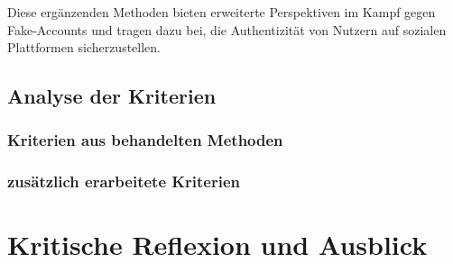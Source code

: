 \documentclass[12pt]{report}
\begin{document}
Diese ergänzenden Methoden bieten erweiterte Perspektiven im Kampf gegen Fake-Accounts und tragen dazu bei, die Authentizität von Nutzern auf sozialen Plattformen sicherzustellen.

\section{Analyse der Kriterien}
\subsection{Kriterien aus behandelten Methoden}
\subsection{zusätzlich erarbeitete Kriterien}

\newpage
\chapter{Kritische Reflexion und Ausblick}
\blindtext


\newpage
{}
\setcounter{page}{\value{frontmatterPage}} %
\addtocounter{page}{1}
\end{document}
